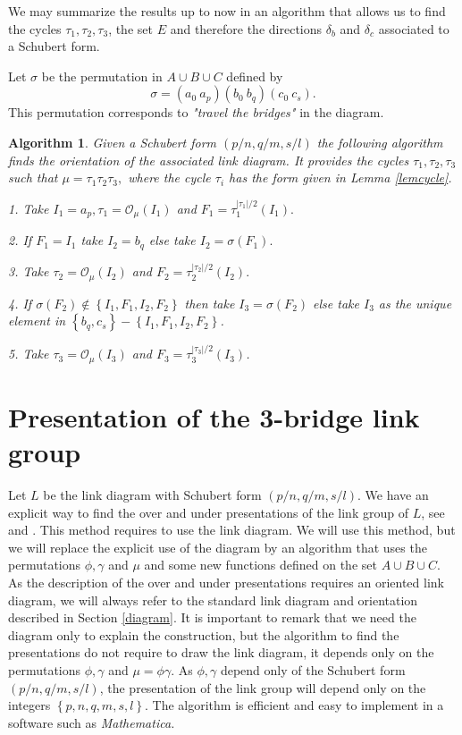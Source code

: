 \documentclass[12pt]{article}%
\newtheorem{algorithm}[theorem]{Algorithm}
\begin{document}
We may summarize the results up to now in an algorithm that allows us to find
the cycles $\tau_{1},\tau_{2},\tau_{3}$, the set $E$ and therefore the
directions $\delta_{b}$ and $\delta_{c}$ associated to a Schubert form.

Let $\sigma$ be the permutation in $A\cup B\cup C$ defined by
\[
\sigma=\left(  a_{0}\ a_{p}\right)  \left(  b_{0}\ b_{q}\right)  \left(
c_{0}\ c_{s}\right)  .
\]
This permutation corresponds to \textit{"travel the bridges"} in the diagram.

\begin{algorithm}
\label{algorithm}Given a Schubert form $\left(  p/n,q/m,s/l\right)  $ the
following algorithm finds the orientation of the associated link diagram. It
provides the cycles $\tau_{1},\tau_{2},\tau_{3}$ such that $\mu=\tau_{1}%
\tau_{2}\tau_{3},$ where the cycle $\tau_{i}$ has the form given in Lemma
\ref{lemcycle}.

1. Take $I_{1}=a_{p},\tau_{1}=\mathcal{O}_{\mu}\left(  I_{1}\right)  $ and
$F_{1}=\tau_{1}^{|\tau_{1}|/2}\left(  I_{1}\right)  .$

2. If $F_{1}=I_{1}$ take $I_{2}=b_{q}$ else take $I_{2}=\sigma\left(
F_{1}\right)  .$

3. Take $\tau_{2}=\mathcal{O}_{\mu}\left(  I_{2}\right)  $ and $F_{2}=\tau
_{2}^{|\tau_{2}|/2}\left(  I_{2}\right)  .$

4. If $\sigma\left(  F_{2}\right)  \notin\left\{  I_{1},F_{1},I_{2}%
,F_{2}\right\}  $ then take $I_{3}=\sigma\left(  F_{2}\right)  $ else take
$I_{3}$ as the unique element in $\left\{  b_{q},c_{s}\right\}  -\left\{
I_{1},F_{1},I_{2},F_{2}\right\}  $.

5. Take $\tau_{3}=\mathcal{O}_{\mu}\left(  I_{3}\right)  $ and $F_{3}=\tau
_{3}^{|\tau_{3}|/2}\left(  I_{3}\right)  $.
\end{algorithm}

\section{Presentation of the 3-bridge link group\label{secgroup}}

Let $L$ be the link diagram with Schubert form $\left(  p/n,q/m,s/l\right)  $.
We have an explicit way to find the over and under presentations of the link
group of $L$, see \cite{BuZi} and \cite{CrFo}. This method requires to use the
link diagram. We will use this method, but we will replace the explicit use of
the diagram by an algorithm that uses the permutations $\phi,\gamma$ and $\mu$
and some new functions defined on the set $A\cup B\cup C$. As the description
of the over and under presentations requires an oriented link diagram, we will
always refer to the standard link diagram and orientation described in Section
\ref{diagram}. It is important to remark that we need the diagram only to
explain the construction, but the algorithm to find the presentations do not
require to draw the link diagram, it depends only on the permutations
$\phi,\gamma$ and $\mu=\phi\gamma$. As $\phi,\gamma$ depend only of the
Schubert form $\left(  p/n,q/m,s/l\right)  $, the presentation of the link
group will depend only on the integers $\left\{  p,n,q,m,s,l\right\}  $. The
algorithm is efficient and easy to implement in a software such as
\textit{Mathematica.}
\end{document}
